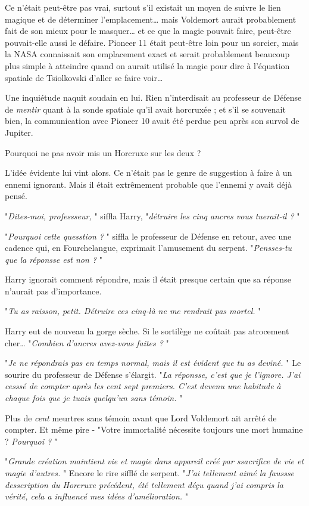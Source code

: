 Ce n'était peut-être pas vrai, surtout s'il existait un moyen de suivre le lien magique et de déterminer l'emplacement… mais Voldemort aurait probablement fait de son mieux pour le masquer… et ce que la magie pouvait faire, peut-être pouvait-elle aussi le défaire. Pioneer 11 était peut-être loin pour un sorcier, mais la NASA connaissait son emplacement exact et serait probablement beaucoup plus simple à atteindre quand on aurait utilisé la magie pour dire à l'équation spatiale de Tsiolkovski d'aller se faire voir…

Une inquiétude naquit soudain en lui. Rien n'interdisait au professeur de Défense de \emph{mentir}  quant à la sonde spatiale qu'il avait horcruxée ; et s'il se souvenait bien, la communication avec Pioneer 10 avait été perdue peu après son survol de Jupiter.

Pourquoi ne pas avoir mis un Horcruxe sur les deux ?

L'idée évidente lui vint alors. Ce n'était pas le genre de suggestion à faire à un ennemi ignorant. Mais il était extrêmement probable que l'ennemi y avait déjà pensé.

"\emph{Dites-moi, professseur,} " siffla Harry, "\emph{détruire les cinq ancres vous tuerait-il ?} "

"\emph{Pourquoi cette quesstion ?} " siffla le professeur de Défense en retour, avec une cadence qui, en Fourchelangue, exprimait l'amusement du serpent. "\emph{Pensses-tu que la réponsse est non ?} "

Harry ignorait comment répondre, mais il était presque certain que sa réponse n'aurait pas d'importance.

"\emph{Tu as raisson, petit. Détruire ces cinq-là ne me rendrait pas mortel.} "

Harry eut de nouveau la gorge sèche. Si le sortilège ne coûtait pas atrocement cher… "\emph{Combien d'ancres avez-vous faites ?} "

"\emph{Je ne répondrais pas en temps normal, mais il est évident que tu as deviné.} " Le sourire du professeur de Défense s'élargit. "\emph{La réponsse, c'est que je l'ignore. J'ai cesssé de compter après les cent sept premiers. C'est devenu une habitude à chaque fois que je tuais quelqu'un sans témoin.} "

Plus de \emph{cent}  meurtres sans témoin avant que Lord Voldemort ait arrêté de compter. Et même pire - "Votre immortalité nécessite toujours une mort humaine ? \emph{Pourquoi ?} "

"\emph{Grande création maintient vie et magie dans appareil créé par ssacrifice de vie et magie d'autres.} " Encore le rire sifflé de serpent. "\emph{J'ai tellement aimé la faussse desscription du Horcruxe précédent, été tellement déçu quand j'ai compris la vérité, cela a influencé mes idées d'amélioration.} "

